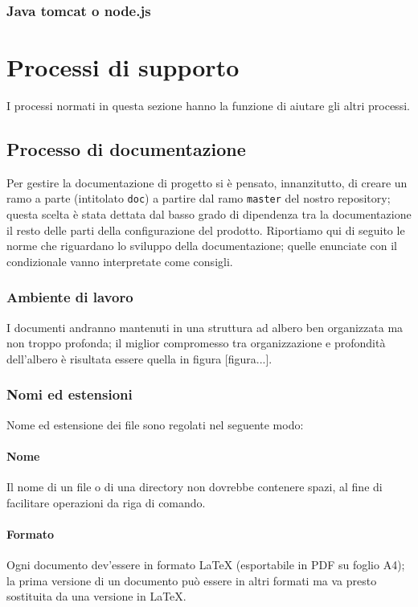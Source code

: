 	\subsubsection{Java tomcat o node.js}

\section{Processi di supporto}
I processi normati in questa sezione hanno la funzione di aiutare gli altri processi.

\subsection{Processo di documentazione}
Per gestire la documentazione di progetto si è pensato, innanzitutto, di creare un ramo a parte (intitolato \texttt{doc}) a partire dal ramo \texttt{master} del nostro repository; questa scelta è stata dettata dal basso grado di dipendenza tra la documentazione il resto delle parti della configurazione del prodotto. Riportiamo qui di seguito le norme che riguardano lo sviluppo della documentazione; quelle enunciate con il condizionale vanno interpretate come consigli.

\subsubsection{Ambiente di lavoro} I documenti andranno mantenuti in una struttura ad albero ben organizzata ma non troppo profonda; il miglior compromesso tra organizzazione e profondità dell'albero è risultata essere quella in figura [figura...].

\subsubsection{Nomi ed estensioni} Nome ed estensione dei file sono regolati nel seguente modo:
\paragraph{Nome} Il nome di un file o di una directory non dovrebbe contenere spazi, al fine di facilitare operazioni da riga di comando.
\paragraph{Formato} Ogni documento dev'essere in formato \LaTeX{} (esportabile in PDF su foglio A4); la prima versione di un documento può essere in altri formati ma va presto sostituita da una versione in \LaTeX.
